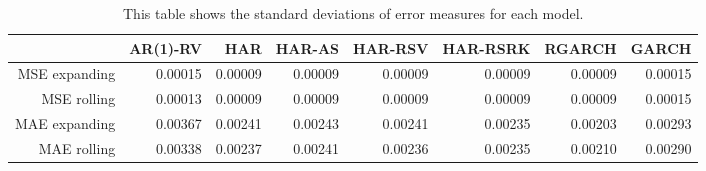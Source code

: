 \begin{table}[ht]
\centering
\begin{tabular}{rrrrrrrr}
  \hline
 & AR(1)-RV & HAR & HAR-AS & HAR-RSV & HAR-RSRK & RGARCH & GARCH \\ 
  \hline
MSE expanding & 0.00015 & 0.00009 & 0.00009 & 0.00009 & 0.00009 & 0.00009 & 0.00015 \\ 
  MSE rolling & 0.00013 & 0.00009 & 0.00009 & 0.00009 & 0.00009 & 0.00009 & 0.00015 \\ 
  MAE expanding & 0.00367 & 0.00241 & 0.00243 & 0.00241 & 0.00235 & 0.00203 & 0.00293 \\ 
  MAE rolling & 0.00338 & 0.00237 & 0.00241 & 0.00236 & 0.00235 & 0.00210 & 0.00290 \\ 
   \hline
\end{tabular}
\caption[Error measures stddevs]{This table shows the standard deviations of error measures for each model. } 
\label{Table:Error_stddevs}
\end{table}
